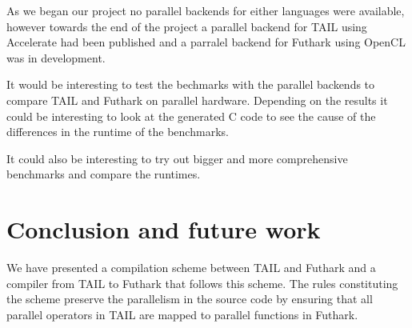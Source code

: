 \documentclass[11pt]{article}
\begin{document}
As we began our project no parallel backends for either languages were available, however towards the end of the project a
parallel backend for TAIL using Accelerate had been published \cite{Array:2015} and a parralel backend for Futhark using OpenCL
was in development.

It would be interesting to test the bechmarks with the parallel backends to compare TAIL and Futhark on parallel hardware.
Depending on the results it could be interesting to look at the generated C code to see the cause of the differences in the
runtime of the benchmarks.

It could also be interesting to try out bigger and more comprehensive benchmarks and compare the runtimes.





\section{Conclusion and future work}
\label{sec:conclusion}
We have presented a compilation scheme between TAIL and Futhark and a compiler from TAIL to Futhark that follows this scheme.
The rules constituting the scheme preserve the parallelism in the source code by ensuring that all parallel operators in TAIL are mapped to parallel functions in Futhark. 
\end{document}

